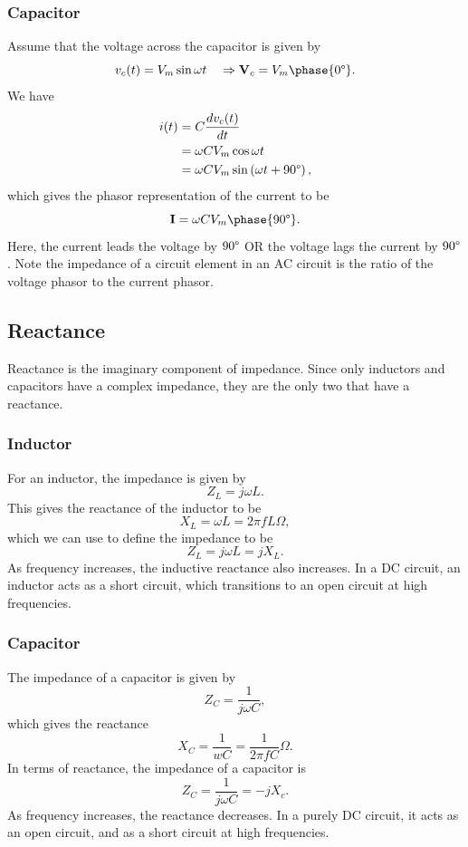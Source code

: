 \documentclass{article}
\begin{document}
\subsubsection{Capacitor}
Assume that the voltage across the capacitor is given by 
\[
    v_c(t)=V_m\sin\omega t\quad\Rightarrow\mathbf{V}_c=V_m\phase{0\degree}.
\]
We have
\begin{align*}
    i(t) &= C \frac{d v_c(t)}{d t}\\
         &=\omega CV_m\cos\omega t\\
         &=\omega CV_m\sin \left( \omega t+90\degree \right),
\end{align*}
which gives the phasor representation of the current to be 
\[
    \mathbf{I}=\omega CV_m\phase{90\degree}.
\]
Here, the current leads the voltage by $90\degree$ OR the voltage lags the current by $90\degree$. Note the impedance of a circuit element in an AC circuit is the ratio of the voltage phasor to the current phasor.

\subsection{Reactance}
Reactance is the imaginary component of impedance. Since only inductors and capacitors have a complex impedance, they are the only two that have a reactance.

\subsubsection{Inductor}
For an inductor, the impedance is given by 
\[
    Z_L=j\omega L.
\]
This gives the reactance of the inductor to be 
\[
    X_L=\omega L=2\pi fL\Omega,
\]
which we can use to define the impedance to be 
\[
    Z_L=j\omega L=jX_L.
\]
As frequency increases, the inductive reactance also increases. In a DC circuit, an inductor acts as a short circuit, which transitions to an open circuit at high frequencies.

\subsubsection{Capacitor}
The impedance of a capacitor is given by 
\[
    Z_C=\frac{1}{j\omega C},
\]
which gives the reactance 
\[
    X_C=\frac{1}{wC}=\frac{1}{2\pi fC}\Omega .
\]
In terms of reactance, the impedance of a capacitor is 
\[
    Z_C=\frac{1}{j\omega C}=-jX_c.
\]
As frequency increases, the reactance decreases. In a purely DC circuit, it acts as an open circuit, and as a short circuit at high frequencies.
\end{document}
